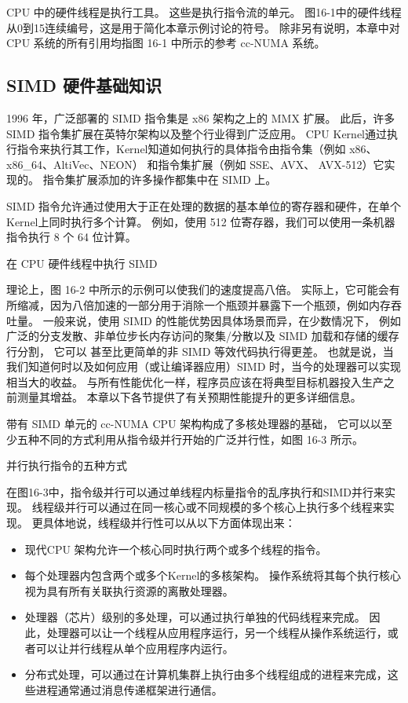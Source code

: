 CPU 中的硬件线程是执行工具。 这些是执行指令流的单元。 
图16-1中的硬件线程从0到15连续编号，这是用于简化本章示例讨论的符号。 
除非另有说明，本章中对 CPU 系统的所有引用均指图 16-1 中所示的参考 cc-NUMA 系统。

\subsection{SIMD 硬件基础知识}
1996 年，广泛部署的 SIMD 指令集是 x86 架构之上的 MMX 扩展。 
此后，许多 SIMD 指令集扩展在英特尔架构以及整个行业得到广泛应用。 
CPU Kernel通过执行指令来执行其工作，Kernel知道如何执行的具体指令由指令集（例如 x86、x86\_64、AltiVec、NEON）
和指令集扩展（例如 SSE、AVX、 AVX-512）它实现的。 指令集扩展添加的许多操作都集中在 SIMD 上。

SIMD 指令允许通过使用大于正在处理的数据的基本单位的寄存器和硬件，在单个Kernel上同时执行多个计算。 
例如，使用 512 位寄存器，我们可以使用一条机器指令执行 8 个 64 位计算。

{\color{red} 在 CPU 硬件线程中执行 SIMD}

理论上，图 16-2 中所示的示例可以使我们的速度提高八倍。 
实际上，它可能会有所缩减，因为八倍加速的一部分用于消除一个瓶颈并暴露下一个瓶颈，例如内存吞吐量。 
一般来说，使用 SIMD 的性能优势因具体场景而异，在少数情况下，
例如广泛的分支发散、非单位步长内存访问的聚集/分散以及 SIMD 加载和存储的缓存行分割，
它可以 甚至比更简单的非 SIMD 等效代码执行得更差。 
也就是说，当我们知道何时以及如何应用（或让编译器应用）SIMD 时，当今的处理器可以实现相当大的收益。 
与所有性能优化一样，程序员应该在将典型目标机器投入生产之前测量其增益。 
本章以下各节提供了有关预期性能提升的更多详细信息。

带有 SIMD 单元的 cc-NUMA CPU 架构构成了多核处理器的基础，
它可以以至少五种不同的方式利用从指令级并行开始的广泛并行性，如图 16-3 所示。

{\color{red} 并行执行指令的五种方式}

在图16-3中，指令级并行可以通过单线程内标量指令的乱序执行和SIMD并行来实现。 
线程级并行可以通过在同一核心或不同规模的多个核心上执行多个线程来实现。 
更具体地说，线程级并行性可以从以下方面体现出来：

\begin{itemize}
	\item 现代CPU 架构允许一个核心同时执行两个或多个线程的指令。

	\item 每个处理器内包含两个或多个Kernel的多核架构。 
	操作系统将其每个执行核心视为具有所有关联执行资源的离散处理器。

	\item 处理器（芯片）级别的多处理，可以通过执行单独的代码线程来完成。 
	因此，处理器可以让一个线程从应用程序运行，另一个线程从操作系统运行，或者可以让并行线程从单个应用程序内运行。

	\item 分布式处理，可以通过在计算机集群上执行由多个线程组成的进程来完成，这些进程通常通过消息传递框架进行通信。
\end{itemize}

